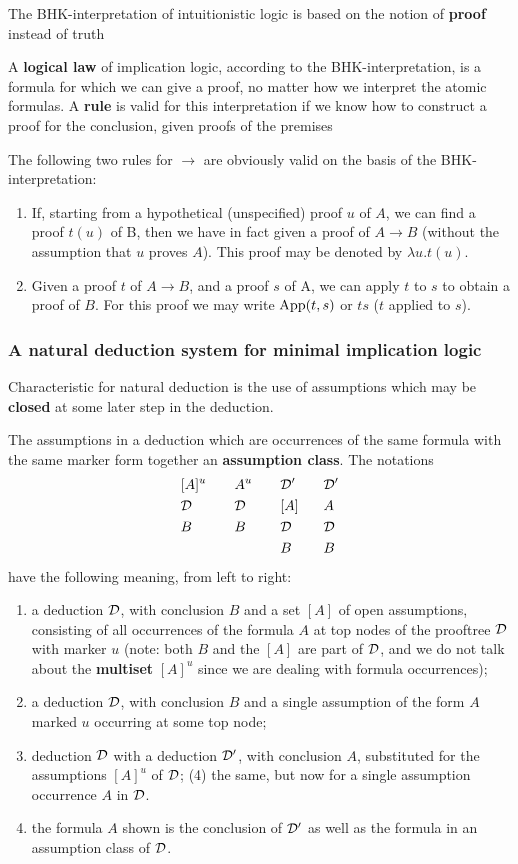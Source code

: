 \documentclass[11pt]{article}
\begin{document}
The BHK-interpretation of intuitionistic logic is based on the notion of \textbf{proof}
instead of truth

A \textbf{logical law} of implication logic, according to the BHK-interpretation, is a
formula for which we can give a proof, no matter how we interpret the atomic
formulas. A \textbf{rule} is valid for this interpretation if we know how to construct
a proof for the conclusion, given proofs of the premises

The following two rules for \(\to\) are obviously valid on the basis of the
BHK-interpretation: 
\begin{enumerate}
\item If, starting from a hypothetical (unspecified) proof \(u\) of \(A\), we can find
a proof \(t(u)\) of B, then we have in fact given a proof of \(A\to B\) (without
the assumption that \(u\) proves \(A\)). This proof may be denoted by
\(\lambda u.t(u)\).
\item Given a proof \(t\) of \(A\to B\), and a proof \(s\) of A, we can apply \(t\) to \(s\)
to obtain a proof of \(B\). For this proof we may write \(\text{App}(t,s)\) or \(ts\) (\(t\)
applied to \(s\)).
\end{enumerate}
\subsubsection{A natural deduction system for minimal implication logic}
\label{sec:orgdceaefe}
Characteristic for natural deduction is the use of assumptions which may
be \textbf{closed} at some later step in the deduction.

The assumptions in a deduction which are occurrences of the same formula
with the same marker form together an \textbf{assumption class}. The notations
\begin{alignat*}{4}
&[A]^u\enspace\enspace&&A^u\enspace\enspace&&\mathcal{D}'\enspace\enspace&&\mathcal{D}'\\
&\mathcal{D}&&\mathcal{D}&&[A]&&A\\
&B&&B&&\mathcal{D}&&\mathcal{D}\\
& && &&B&&B
\end{alignat*}
have the following meaning, from left to right: 
\begin{enumerate}
\item a deduction \(\mathcal{D}\), with
conclusion \(B\) and a set \([A]\) of open assumptions, consisting of all
occurrences of 
the formula \(A\) at top nodes of the prooftree \(\mathcal{D}\) with marker \(u\) (note: both \(B\)
and the \([A]\) are part of \(\mathcal{D}\), and we do not talk about the \textbf{multiset} \([A]^u\) since
we are dealing with formula occurrences);
\item a deduction \(\mathcal{D}\), with conclusion
\(B\) and a single assumption of the form \(A\) marked \(u\) occurring at some top
node;
\item deduction \(\mathcal{D}\) with a deduction \(\mathcal{D}'\), with conclusion \(A\), substituted
for the assumptions \([A]^u\) of \(\mathcal{D}\); (4) the same, but now for a single assumption
occurrence \(A\) in \(\mathcal{D}\).
\item the formula \(A\) shown is the conclusion of \(\mathcal{D}'\)
as well as the formula in an assumption class of \(\mathcal{D}\).
\end{enumerate}
\end{document}
